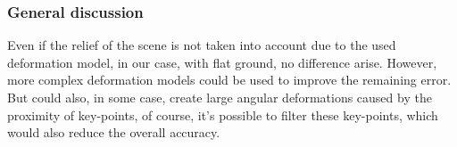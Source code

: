 \documentclass[../thesis.tex]{subfiles}
\begin{document}

	\subsubsection{General discussion}
	
	\par Even if the relief of the scene is not taken into account due to the used deformation model,
	in our case, with flat ground, no difference arise.
	However, more complex deformation models  \cite{Lombaert, ThinPlateSpline}
	could be used to improve the remaining error.
	But could also, in some case, create large angular deformations caused by the proximity of key-points,
	of course, it's possible to filter these key-points, which would also reduce the overall accuracy.
	
\end{document}
